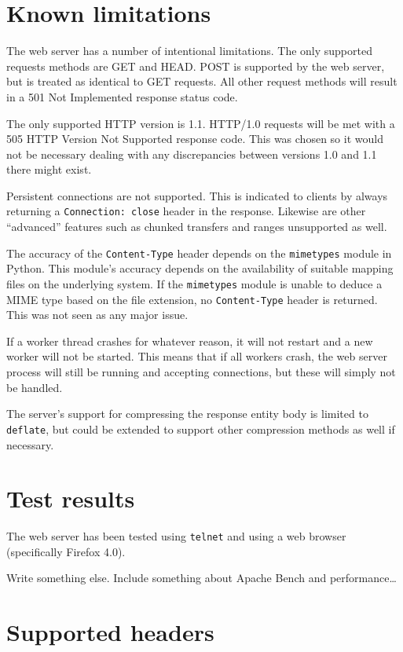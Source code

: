 \documentclass{sig-alternate}
\begin{document}
\section{Known limitations}

The web server has a number of intentional limitations. The only supported
requests methods are GET and HEAD. POST is supported by the web server, but
is treated as identical to GET requests. All other request methods will
result in a 501 Not Implemented response status code.

The only supported HTTP version is 1.1. HTTP/1.0 requests will be met with
a 505 HTTP Version Not Supported response code. This was chosen so it would
not be necessary dealing with any discrepancies between versions 1.0 and 1.1
there might exist.

Persistent connections are not supported. This is indicated to clients
by always returning a \verb+Connection: close+ header in the response.
Likewise are other ``advanced'' features such as chunked transfers and ranges
unsupported as well.

The accuracy of the \verb+Content-Type+ header depends on the \verb+mimetypes+
module in Python. This module's accuracy depends on the availability of
suitable mapping files on the underlying system. If the \verb+mimetypes+
module is unable to deduce a MIME type based on the file extension, no
\verb+Content-Type+ header is returned. This was not seen as any major issue.

If a worker thread crashes for whatever reason, it will not restart and a
new worker will not be started. This means that if all workers crash,
the web server process will still be running and accepting connections,
but these will simply not be handled.

The server's support for compressing the response entity body is limited to
\verb+deflate+, but could be extended to support other compression methods as
well if necessary.


\section{Test results}

The web server has been tested using \verb+telnet+ and using a web browser
(specifically Firefox 4.0).

Write something else. Include something about Apache Bench and
performance\ldots


\section{Supported headers}
\end{document}
